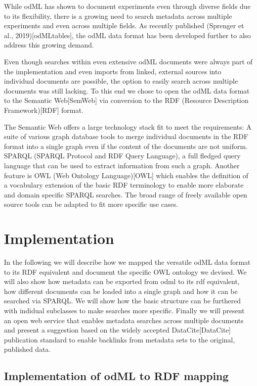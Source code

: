 \documentclass{article}
\begin{document}
While odML has shown to document experiments even through diverse fields due to its
flexibility, there is a growing need to search metadata across multiple experiments
and even across multiple fields. As recently published (Sprenger et al., 2019)[odMLtables],
the odML data format has been developed further to also address this growing demand.

Even though searches within even extensive odML documents were always part of the
implementation and even imports from linked, external sources into individual documents
are possible, the option to easily search across multiple documents was still lacking.
To this end we chose to open the odML data format to the Semantic Web[SemWeb] via
conversion to the RDF (Resource Description Framework)[RDF] format.

The Semantic Web offers a large technology stack fit to meet the requirements:
A suite of various graph database tools to merge individual documents in the RDF format
into a single graph even if the content of the documents are not uniform.
SPARQL (SPARQL Protocol and RDF Query Language), a full fledged query language that can
be used to extract information from such a graph.
Another feature is OWL (Web Ontology Language)[OWL] which enables the definition of a
vocabulary extension of the basic RDF terminology to enable more elaborate and domain
specific SPARQL searches. The broad range of freely available open source tools can be
adapted to fit more specific use cases.

\section{Implementation}

In the following we will describe how we mapped the versatile odML data format to
its RDF equivalent and document the specific OWL ontology we devised. We will also
show how metadata can be exported from odml to its rdf equivalent, how different
documents can be loaded into a single graph and how it can be searched via SPARQL.
We will show how the basic structure can be furthered with indidual subclasses to
make searches more specific.
Finally we will present an open web service that enables metadata searches across multiple
documents and present a suggestion based on the widely accepted DataCite[DataCite]
publication standard to enable backlinks from metadata sets to the original, published data.

\subsection{Implementation of odML to RDF mapping}
\end{document}
